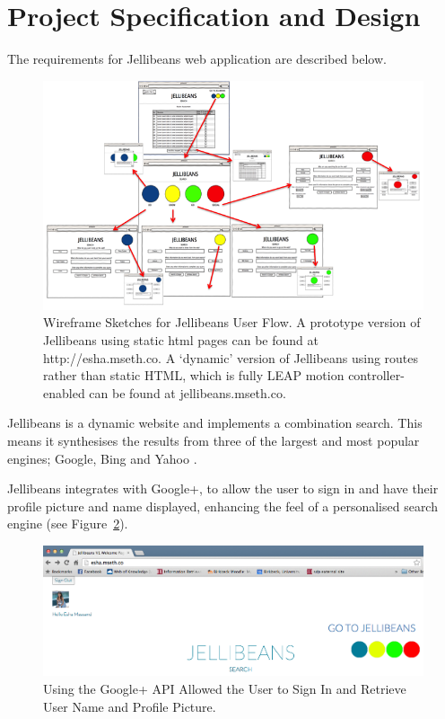 \documentclass[a4paper, 11pt]{article}
\begin{document}
\section{Project Specification and Design} 

The requirements for Jellibeans web application are described below. 

\begin{figure}[H]
\begin{center}
\includegraphics[scale=0.65]{JellibeanUserFlow.png}
\end{center}
\caption{Wireframe Sketches for Jellibeans User Flow. A prototype version of Jellibeans using static html pages can be found at http://esha.mseth.co. A `dynamic' version of Jellibeans using routes rather than static HTML, which is fully LEAP motion controller-enabled can be found at jellibeans.mseth.co. }
\label{JBeanUserFlow}
\end{figure}


\vspace{5mm}
Jellibeans is a dynamic website and implements a combination search. This means it synthesises the results from three of the largest and most popular engines; Google, Bing and Yahoo \cite{adam}.

\vspace{5mm}
Jellibeans integrates with Google+, to allow the user to sign in and have their profile picture and name displayed, enhancing the feel of a personalised search engine (see Figure~\ref{googlesignin}).

\begin{figure}[H]
\begin{center}
\includegraphics[scale=0.25]{helloEsha}
\end{center}
\caption{Using the Google+ API Allowed the User to Sign In and Retrieve User Name and Profile Picture.}
\label{googlesignin}
\end{figure}
\end{document}

